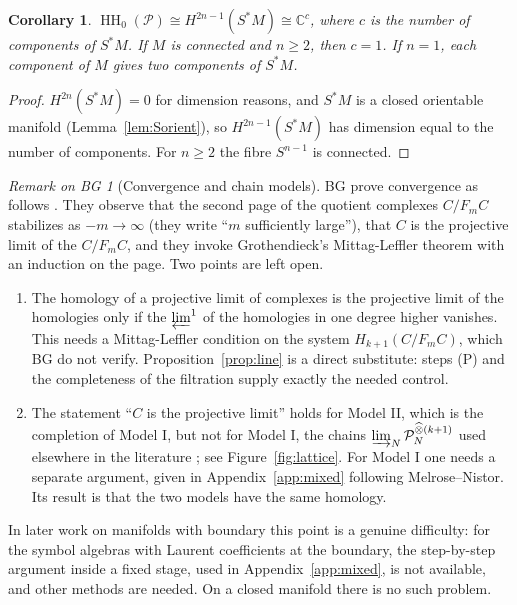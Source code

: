 \documentclass[11pt,oneside,reqno]{article}
\DeclareMathOperator{\HH}{HH}
\newcommand{\C}{\mathbb C}
\newcommand{\cP}{\mathcal P}
\newcommand{\hot}{\mathbin{\widehat\otimes}}
\theoremstyle{plain}
\newtheorem{corollary}[theorem]{Corollary}
\theoremstyle{definition}
\theoremstyle{remark}
\newtheorem{bgremark}[theorem]{Remark on BG}
\begin{document}
\begin{corollary}\label{cor:HH0}
\(\HH_0(\cP)\cong H^{2n-1}(S^*M)\cong\C^{c}\), where \(c\) is the number of components of
\(S^*M\). If \(M\) is connected and \(n\ge2\), then \(c=1\). If \(n=1\), each component of \(M\)
gives two components of \(S^*M\).
\end{corollary}

\begin{proof}
\(H^{2n}(S^*M)=0\) for dimension reasons, and \(S^*M\) is a closed orientable manifold
(Lemma~\ref{lem:Sorient}), so \(H^{2n-1}(S^*M)\) has dimension equal to the number
of components. For \(n\ge2\) the fibre \(S^{n-1}\) is connected.
\end{proof}

\begin{bgremark}[Convergence and chain models]\label{rem:convergence}
BG prove convergence as follows \cite[\S\S2,4]{BG}. They observe that the
second page of the quotient complexes \(C/F_mC\) stabilizes as \(-m\to\infty\) (they
write ``\(m\) sufficiently large''), that \(C\) is the projective limit of the
\(C/F_mC\), and they invoke Grothendieck's Mittag-Leffler theorem with an
induction on the page. Two points are left open.
\begin{enumerate}
\item The homology of a projective limit of complexes is the projective limit of
the homologies only if the \(\varprojlim^1\) of the homologies in one degree higher
vanishes. This needs a Mittag-Leffler condition on the system
\(H_{k+1}(C/F_mC)\), which BG do not verify. Proposition~\ref{prop:line} is a
direct substitute: steps (P) and the completeness of the filtration supply
exactly the needed control.
\item The statement ``\(C\) is the projective limit'' holds for Model II, which is
the completion of Model I, but not for Model I, the chains
\(\varinjlim_N\cP_N^{\hot(k+1)}\) used elsewhere in the literature
\cite{MN,BN}; see Figure~\ref{fig:lattice}. For Model I one needs a separate
argument, given in Appendix~\ref{app:mixed} following Melrose--Nistor. Its result
is that the two models have the same homology.
\end{enumerate}
In later work on manifolds with boundary \cite{MN,LauterMoroianu} this point
is a genuine difficulty: for the symbol algebras with Laurent coefficients at the
boundary, the step-by-step argument inside a fixed stage, used in
Appendix~\ref{app:mixed}, is not available, and other methods are needed. On a closed
manifold there is no such problem.
\end{bgremark}
\end{document}
